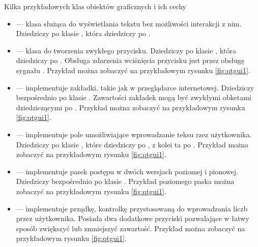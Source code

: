 \par
Kilka przykładowych klas obiektów graficznych i ich cechy
\begin{itemize}
    \item {} --- klasa służąca do wyświetlania tekstu bez możliwości interakcji z nim.
          Dziedziczy po klasie , która dziedziczy po .

    \item {} --- klasa do tworzenia zwykłego przycisku.
          Dziedziczy po klasie , która dziedziczy po .
          Obsługa zdarzenia wciśnięcia przycisku jest przez obsługę sygnału .
          Przykład można zobaczyć na przykładowym rysunku \ref{fig:qtgui1}.

    \item {} --- implementuje zakładki, takie jak w przeglądarce internetowej.
          Dziedziczy bezpośrednio po klasie .
          Zawartości zakładek mogą być zwykłymi obketami dziedziczącymi po .
          Przykład można zobaczyć na przykładowym rysunku \ref{fig:qtgui1}.

    \item {} --- implementuje pole umożliwiające wprowadzanie teksu rzez użytkownika.
          Dziedziczy po klasie , które dziedziczy po  , z kolei ta po .
          Przykład można zobaczyć na przykładowym rysunku \ref{fig:qtgui1}.

    \item {} --- implementuje pasek postępu w dwóch wersjach poziomej i pionowej.
          Dziedziczy bezpośrednio po klasie .
          Przykład poziomego paska można zobaczyć na przykładowym rysunku \ref{fig:qtgui1}.

    \item {} --- implementuje prządkę, kontrolkę przystosowaną do wprowadzania liczb przez użytkownika.
          Posiada dwa dodatkowe przyciski pozwalające w łatwy sposób zwiększyć lub zmniejszyć zawartość.
          Przykład można zobaczyć na przykładowym rysunku \ref{fig:qtgui1}.

\end{itemize}